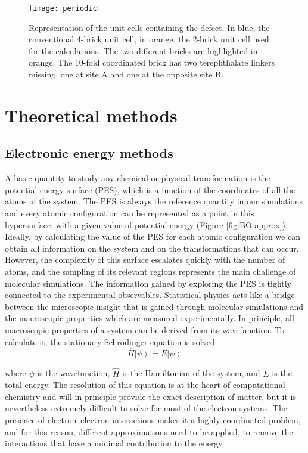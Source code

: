\begin{figure}[!htbp]
	\centering
 	\texttt{[image: periodic]}
	\caption{Representation of the unit cells containing the defect. In blue, the conventional 4-brick unit cell, in orange, the 2-brick unit cell used for the calculations. The two different bricks are highlighted in orange. The 10-fold coordinated brick has two terephthalate linkers missing, one at site A and one at the opposite site B.}
	\label{fig:periodic}
\end{figure}

\section{Theoretical methods}
\subsection{Electronic energy methods}
A basic quantity to study any chemical or physical transformation is the potential energy surface (PES), which is a function of the coordinates of all the atoms of the system. The PES is always the reference quantity in our simulations and every atomic configuration can be represented as a point in this hypersurface, with a given value of potential energy (Figure \ref{fig:BO-approx}).
Ideally, by calculating the value of the PES for each atomic configuration we can obtain all information on the system and on the transformations that can occur. However, the complexity of this surface escalates quickly with the number of atoms, and the sampling of its relevant regions represents the main challenge of molecular simulations. The information gained by exploring the PES is tightly connected to the experimental observables. Statistical physics acts like a bridge between the microscopic insight that is gained through molecular simulations and the macroscopic properties which are measured experimentally. In principle, all macroscopic properties of a system can be derived from its wavefunction. To calculate it, the stationary Schr\"{o}dinger equation is solved: 
\[
\hat{H}\left\vert\psi\right\rangle = E\left\vert\psi\right\rangle
\]

where $\psi$ is the wavefunction, $\hat{H}$ is the Hamiltonian of the system, and $E$ is the total energy. The resolution of this equation is at the heart of computational chemistry and will in principle provide the exact description of matter, but it is nevertheless extremely difficult to solve for most of the electron systems. The presence of electron--electron interactions makes it a highly coordinated problem, and for this reason, different approximations need to be applied, to remove the interactions that have a minimal contribution to the energy.

